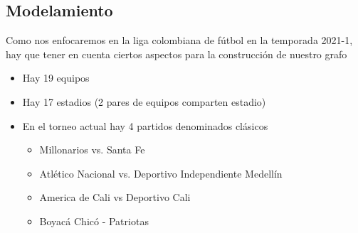\documentclass[11pt]{article}
\begin{document}
\begin{multicols}{2}
        \section{Modelamiento}
            Como nos enfocaremos en la liga colombiana de fútbol en la temporada 2021-1, hay que 
            tener en cuenta ciertos aspectos para la construcción de nuestro grafo
            \begin{itemize}
                \item  Hay 19 equipos
                \item  Hay 17 estadios (2 pares de equipos comparten estadio)
                \item  En el torneo actual hay 4 partidos denominados clásicos
                \begin{itemize}
                    \item  Millonarios vs. Santa Fe
                    \item  Atlético Nacional vs. Deportivo Independiente Medellín
                    \item America de Cali vs Deportivo Cali
                    \item  Boyacá Chicó - Patriotas
                \end{itemize}
            \end{itemize}


\end{multicols}
\end{document}
